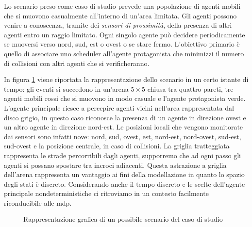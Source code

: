 Lo scenario preso come caso di studio prevede una popolazione di agenti mobili che si muovono casualmente all'interno di un'area limitata. Gli agenti possono venire a conoscenza, tramite dei \emph{sensori di prossimità}, della presenza di altri agenti entro un raggio limitato.
Ogni singolo agente può decidere periodicamente se muoversi verso nord, sud, est o ovest o se stare fermo.
L’obiettivo primario è quello di associare uno scheduler all'agente protagonista che minimizzi il numero di collisioni con altri agenti che si verificheranno.

In figura \ref{fig:caso:esempio} viene riportata la rappresentazione dello scenario in un certo istante di tempo: gli eventi si succedono in un'arena $5\times 5$ chiusa tra quattro pareti, tre agenti mobili rossi che si muovono in modo casuale e l'agente protagonista verde. L'agente principale riesce a percepire agenti vicini nell'area rappresentata dal disco grigio, in questo caso riconosce la presenza di un agente in direzione ovest e un altro agente in direzione nord-est. Le posizioni locali che vengono monitorate dai sensori sono infatti nove: nord, sud, ovest, est, nord-est, nord-ovest, sud-est, sud-ovest e la posizione centrale, in caso di collisioni. La griglia tratteggiata rappresenta le strade percorribili dagli agenti, supporremo che ad ogni passo gli agenti si possano spostare tra incroci adiacenti. Questa astrazione a griglia dell'arena rappresenta un vantaggio ai fini della modellazione in quanto lo spazio degli stati è discreto. Considerando anche il tempo discreto e le scelte dell'agente principale nondeterministiche ci ritroviamo in un contesto facilmente riconducibile alle \ac{mdp}.
\begin{figure}[htb]
	\begin{center}
	\end{center}
	\caption{Rappresentazione grafica di un possibile scenario del caso di studio}
	\label{fig:caso:esempio}
\end{figure}

